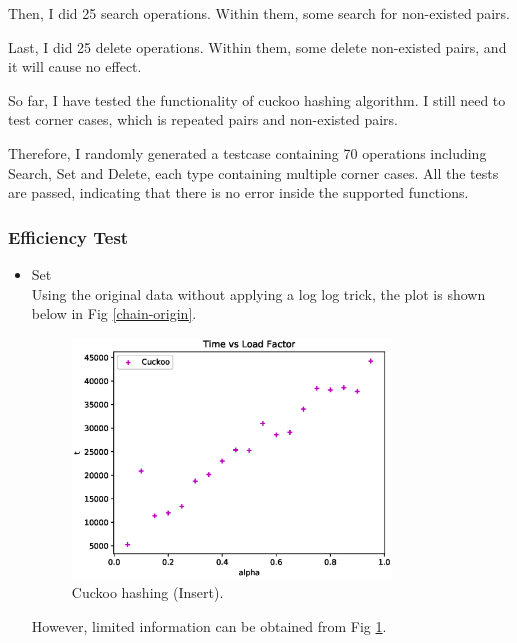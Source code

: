 \documentclass{article}
\begin{document}
\begin{spacing}{1.2}
Then, I did 25 search operations. Within them, some search for non-existed pairs.

Last, I did 25 delete operations. Within them, some delete non-existed pairs, and it will cause no effect.

So far, I have tested the functionality of cuckoo hashing algorithm. I still need to test corner cases, which is repeated pairs and non-existed pairs.

Therefore, I randomly generated a testcase containing 70 operations including Search, Set and Delete, each type containing multiple corner cases. All the tests are passed, indicating that there is no error inside the supported functions.

\subsubsection{Efficiency Test}
\begin{itemize}
    \item Set\\
    Using the original data without applying a log log trick, the plot is shown below in Fig \ref{chain-origin}.
    \begin{figure}[!htb]
        \centering
        \includegraphics[width=0.8\textwidth]{../output/fig/insert_original_cuckoo.eps}
        \caption{Cuckoo hashing (Insert).}
        \label{cuckoo-origin}
    \end{figure}
    However, limited information can be obtained from Fig \ref{cuckoo-origin}.


\end{itemize}
\end{spacing}
\end{document}
